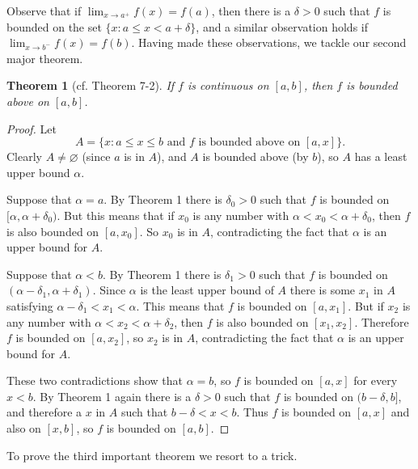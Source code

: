 \documentclass{article}
\numberwithin{corollary}{subsection}
\numberwithin{definition}{subsection}
\numberwithin{lemma}{subsection}
\numberwithin{theorem}{subsection}
\newtheorem*{theorem*}{Theorem}
\begin{document}
Observe that if $\lim_{x \to a^+} f(x) = f(a)$, then there is a $\delta > 0$
such that $f$ is bounded on the set $\{x: a \leq x < a + \delta\}$, and a
similar observation holds if $\lim_{x \to b^-} f(x) = f(b)$. Having made these
observations, we tackle our second major theorem.

\begin{theorem*}[cf. Theorem 7-2]
  If $f$ is continuous on $[a, b]$, then $f$ is bounded above on $[a, b]$.
\end{theorem*}
\begin{proof}
  Let \[
    A = \{x: a \leq x \leq b \text{ and } f \text{ is bounded above on } [a,
      x]\}.
  \] Clearly $A \neq \varnothing$ (since $a$ is in $A$), and $A$ is bounded
  above (by $b$), so $A$ has a least upper bound $\alpha$.

  Suppose that $\alpha = a$. By Theorem 1 there is $\delta_0 > 0$ such that $f$
  is bounded on $[\alpha, \alpha + \delta_0)$. But this means that if $x_0$ is
  any number with $\alpha < x_0 < \alpha + \delta_0$, then $f$ is also bounded
  on $[a, x_0]$. So $x_0$ is in $A$, contradicting the fact that $\alpha$ is an
  upper bound for $A$.

  Suppose that $\alpha < b$. By Theorem 1 there is $\delta_1 > 0$ such that $f$
  is bounded on $(\alpha - \delta_1, \alpha + \delta_1)$. Since $\alpha$ is the
  least upper bound of $A$ there is some $x_1$ in $A$ satisfying $\alpha -
  \delta_1 < x_1 < \alpha$. This means that $f$ is bounded on $[a, x_1]$. But
  if $x_2$ is any number with $\alpha < x_2 < \alpha + \delta_2$, then $f$ is
  also bounded on $[x_1, x_2]$. Therefore $f$ is bounded on $[a, x_2]$, so
  $x_2$ is in $A$, contradicting the fact that $\alpha$ is an upper bound for
  $A$.

  These two contradictions show that $\alpha = b$, so $f$ is bounded on $[a,
  x]$ for every $x < b$. By Theorem 1 again there is a $\delta > 0$ such that
  $f$ is bounded on $(b - \delta, b]$, and therefore a $x$ in $A$ such that $b
  - \delta < x < b$. Thus $f$ is bounded on $[a, x]$ and also on $[x, b]$, so
  $f$ is bounded on $[a, b]$.
\end{proof}

To prove the third important theorem we resort to a trick.
\end{document}
